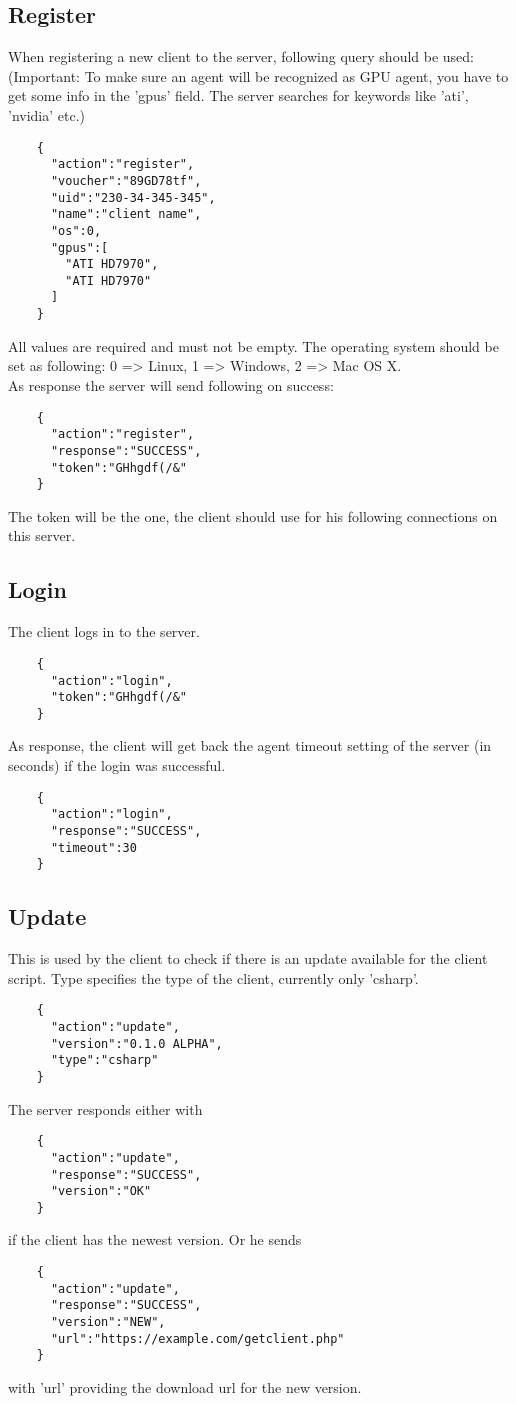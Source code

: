 \documentclass{article}
\begin{document}
	\subsection*{Register}
	When registering a new client to the server, following query should be used:
	(Important: To make sure an agent will be recognized as GPU agent, you have to get some info in the 'gpus' field. The server searches for keywords like 'ati', 'nvidia' etc.)
	\begin{verbatim}
	{
	  "action":"register",
	  "voucher":"89GD78tf",
	  "uid":"230-34-345-345",
	  "name":"client name",
	  "os":0,
	  "gpus":[
	    "ATI HD7970",
	    "ATI HD7970"
	  ]
	}
	\end{verbatim}
	All values are required and must not be empty. The operating system should be set as following: 0 => Linux, 1 => Windows, 2 => Mac OS X.\\
	As response the server will send following on success:
	\begin{verbatim}
	{
	  "action":"register",
	  "response":"SUCCESS",
	  "token":"GHhgdf(/&"
	} 
	\end{verbatim}
	The token will be the one, the client should use for his following connections on this server.
	
	\subsection*{Login}
	The client logs in to the server.
	\begin{verbatim}
	{
	  "action":"login",
	  "token":"GHhgdf(/&"
	}
	\end{verbatim}
	As response, the client will get back the agent timeout setting of the server (in seconds) if the login
	was successful.
	\begin{verbatim}
	{
	  "action":"login",
	  "response":"SUCCESS",
	  "timeout":30
	}
	\end{verbatim}
	
	\subsection*{Update}
	This is used by the client to check if there is an update available for the client script. Type specifies the type of the client, currently only 'csharp'.
	\begin{verbatim}
	{
	  "action":"update",
	  "version":"0.1.0 ALPHA",
	  "type":"csharp"
	}
	\end{verbatim}
	The server responds either with
	\begin{verbatim}
	{
	  "action":"update",
	  "response":"SUCCESS",
	  "version":"OK"
	}
	\end{verbatim}
	if the client has the newest version. Or he sends
	\begin{verbatim}
	{
	  "action":"update",
	  "response":"SUCCESS",
	  "version":"NEW",
	  "url":"https://example.com/getclient.php"
	}
	\end{verbatim}
	with 'url' providing the download url for the new version.
	
\end{document}
